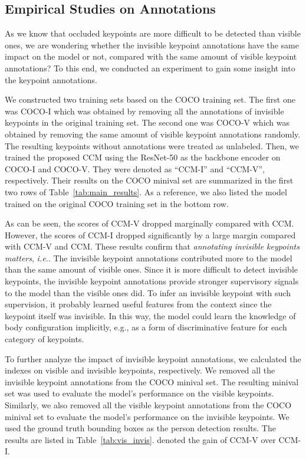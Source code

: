 \documentclass[twocolumn]{svjour3}          \smartqed  \usepackage{natbib}
\begin{document}
\subsection{Empirical Studies on Annotations}
\label{subsec:insight}
As we know that occluded keypoints are more difficult to be detected than visible ones, we are wondering whether the invisible keypoint annotations have the same impact on the model or not, compared with the same amount of visible keypoint annotations? To this end, we conducted an experiment to gain some insight into the keypoint annotations.

We constructed two training sets based on the COCO training set. The first one was COCO-I which was obtained by removing all the annotations of invisible keypoints in the original training set. The second one was COCO-V which was obtained by removing the same amount of visible keypoint annotations randomly. The resulting keypoints without annotations were treated as unlabeled. Then, we trained the proposed CCM using the ResNet-50 as the backbone encoder on COCO-I and COCO-V. They were denoted as ``CCM-I'' and ``CCM-V'', respectively. Their results on the COCO minival set are summarized in the first two rows of Table~\ref{tab:main_results}. As a reference, we also listed the model trained on the original COCO training set in the bottom row.

As can be seen, the scores of CCM-V dropped marginally compared with CCM. However, the scores of CCM-I dropped significantly by a large margin compared with CCM-V and CCM. These results confirm that \emph{{annotating invisible keypoints matters}}, \emph{i.e.}. The invisible keypoint annotations contributed more to the model than the same amount of visible ones. Since it is more difficult to detect invisible keypoints, the invisible keypoint annotations provide stronger supervisory signals to the model than the visible ones did. To infer an invisible keypoint with such supervision, it probably learned useful features from the context since the keypoint itself was invisible. In this way, the model could learn the knowledge of body configuration implicitly, e.g., as a form of discriminative feature for each category of keypoints.

To further analyze the impact of invisible keypoint annotations, we calculated the indexes on visible and invisible keypoints, respectively. We removed all the invisible keypoint annotations from the COCO minival set. The resulting minival set was used to evaluate the model's performance on the visible keypoints. Similarly, we also removed all the visible keypoint annotations from the COCO minival set to evaluate the model's performance on the invisible keypoints. We used the ground truth bounding boxes as the person detection results. The results are listed in Table~\ref{tab:vis_invis}.  denoted the gain of CCM-V over CCM-I.
\end{document}
